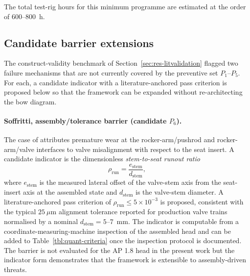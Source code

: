 The total test-rig hours for this minimum programme are estimated at
the order of 600--800~h.

\subsection{Candidate barrier extensions}\label{sec:roadmap-barriers}

The construct-validity benchmark of
Section~\ref{sec:res-litvalidation} flagged two failure mechanisms
that are not currently covered by the preventive set
$P_{1}$--$P_{5}$. For each, a candidate indicator with a
literature-anchored pass criterion is proposed below so that the
framework can be expanded without re-architecting the bow diagram.

\paragraph{Soffritti, assembly/tolerance barrier (candidate
$P_{6}$).} The case of \citet{soffritti2018wornvalvetrain} attributes
premature wear at the rocker-arm/pushrod and rocker-arm/valve
interfaces to valve misalignment with respect to the seat insert.
A candidate indicator is the dimensionless \emph{stem-to-seat runout
ratio}
\begin{equation}
\rho_{\mathrm{run}}=\frac{e_{\mathrm{stem}}}{d_{\mathrm{stem}}},
\label{eq:runout}
\end{equation}
where $e_{\mathrm{stem}}$ is the measured lateral offset of the
valve-stem axis from the seat-insert axis at the assembled state
and $d_{\mathrm{stem}}$ is the valve-stem diameter. A
literature-anchored pass criterion of
$\rho_{\mathrm{run}}\leq 5\times 10^{-3}$ is proposed, consistent
with the typical $25~\mu\mathrm{m}$ alignment tolerance reported for
production valve trains \citep{heisler2002} normalised by a
nominal $d_{\mathrm{stem}}=5$--$7$~mm. The indicator is computable
from a coordinate-measuring-machine inspection of the assembled
head and can be added to Table~\ref{tbl:quant-criteria} once the
inspection protocol is documented. The barrier is not evaluated for
the AP 1.8 head in the present work but the indicator form
demonstrates that the framework is extensible to assembly-driven
threats.

